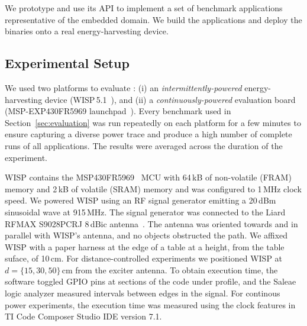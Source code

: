 We prototype \sys and use its API to implement a set of benchmark applications representative of the embedded domain. We build the applications and deploy the binaries onto a real energy-harvesting device. 


\subsection{Experimental Setup}
\label{sec:results_hardware_software}

We used two platforms to evaluate \sys: (i) an \emph{intermittently-powered}
energy-harvesting device (WISP\,5.1~\cite{wisp5,wisp}), and (ii) a \emph{continuously-powered} evaluation
board (MSP-EXP430FR5969 launchpad~\cite{MSP-EXP430FR5969_launchpad}).
%
Every benchmark used in Section~\ref{sec:evaluation} was run repeatedly on
each platform for a few minutes to ensure capturing a diverse power 
trace and produce a high number of complete runs of all applications.
The results were averaged across the duration of the experiment.

WISP contains the MSP430FR5969~\cite{wolverine} MCU with 64\,kB of
non-volatile (FRAM) memory and 2\,kB of volatile (SRAM) memory and was
configured to 1\,MHz clock speed.
%
We powered WISP using an RF signal generator emitting a 20\,dBm sinusoidal wave at 915\,MHz.
The signal generator was connected to the Liard RFMAX S9028PCRJ 8\,dBic
antenna~\cite{atlas2015}.
%
The antenna was oriented towards and in parallel with WISP's antenna, and
no objects obstructed the path.
%
We affixed WISP with a paper harness at the edge of a table at a height, from the table suface, of 10\,cm.
%
For distance-controlled experiments we positioned WISP at $d=\{15, 30,
50\}$\,cm from the exciter antenna.
%
%
To obtain execution time, the software toggled GPIO pins at sections of the code
under profile, and the Saleae~\cite{saleae} logic analyzer measured
intervals between edges in the signal. For continous power experiments, the 
execution time was measured using the clock features in TI Code Composer Studio IDE version 7.1.
%
